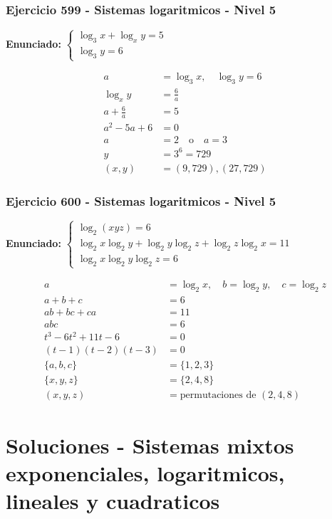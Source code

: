 \documentclass[12pt,a4paper]{article}
\begin{document}
\subsubsection*{Ejercicio 599 - Sistemas logaritmicos - Nivel 5}
\textbf{Enunciado:} \(\begin{cases}\log_3x+\log_xy=5\\ \log_3y=6\end{cases}\)

\[
\begin{aligned}
a&=\log_3x,
\quad \log_3y=6\\
\log_xy&=\frac6a\\
a+\frac6a&=5\\
a^2-5a+6&=0\\
a&=2\quad \text{o}\quad a=3\\
y&=3^6=729\\
(x,y)&=\boxed{(9,729),(27,729)}
\end{aligned}
\]


\subsubsection*{Ejercicio 600 - Sistemas logaritmicos - Nivel 5}
\textbf{Enunciado:} \(\begin{cases}\log_2(xyz)=6\\ \log_2x\log_2y+\log_2y\log_2z+\log_2z\log_2x=11\\ \log_2x\log_2y\log_2z=6\end{cases}\)

\[
\begin{aligned}
a&=\log_2x,
\quad b=\log_2y,
\quad c=\log_2z\\
a+b+c&=6\\
ab+bc+ca&=11\\
abc&=6\\
t^3-6t^2+11t-6&=0\\
(t-1)(t-2)(t-3)&=0\\
\{a,b,c\}&=\{1,2,3\}\\
\{x,y,z\}&=\{2,4,8\}\\
(x,y,z)&=\boxed{\text{permutaciones de }(2,4,8)}
\end{aligned}
\]


\newpage
\section*{Soluciones - Sistemas mixtos exponenciales, logaritmicos, lineales y cuadraticos}
\end{document}

